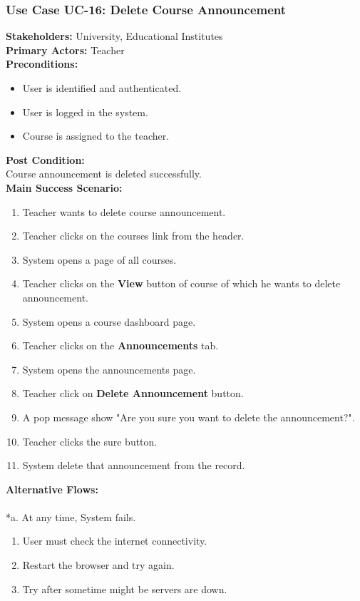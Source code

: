 \documentclass[12pt]{article}
\begin{document}
\subsubsection{Use Case UC-16: Delete Course Announcement}
\textbf{Stakeholders: } University, Educational Institutes \\
\textbf{Primary Actors: }Teacher \\
\textbf{Preconditions:}
\begin{itemize}
\item User is identified and authenticated.
\item User is logged in the system.
\item Course is assigned to the teacher.
\end{itemize}
\textbf{Post Condition: }\\
Course announcement is deleted successfully.\\
\textbf{Main Success Scenario:}
\begin{enumerate}
\item Teacher wants to delete course announcement.
\item Teacher clicks on the courses link from the header.
\item System opens a page of all courses.
\item Teacher clicks on the \textbf{View} button of course of which he wants to delete announcement.
\item System opens a course dashboard page.
\item Teacher clicks on the \textbf{Announcements} tab.
\item System opens the announcements page.
\item Teacher click on \textbf{Delete Announcement} button.
\item A pop message show "Are you sure you want to delete the announcement?".
\item Teacher clicks the sure button.
\item System delete that announcement from the record.
\end{enumerate}
\textbf{Alternative Flows:}\\
\\
*a. At any time, System fails.
\begin{enumerate}
\item User must check the internet connectivity.
\item Restart the browser and try again.
\item Try after sometime might be servers are down.
\end{enumerate}
\end{document}
